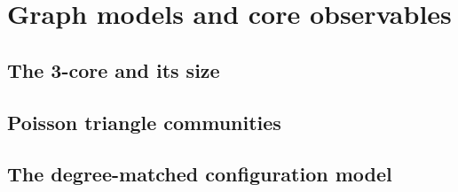 \section{Graph models and core observables}
\label{sec:models-and-observables}

\subsection{The 3-core and its size}
\label{sec:core-and-observables}

\subsection{Poisson triangle communities}
\label{sec:triangle-model}

\subsection{The degree-matched configuration model}
\label{sec:configuration-model}

\par\allowbreak
